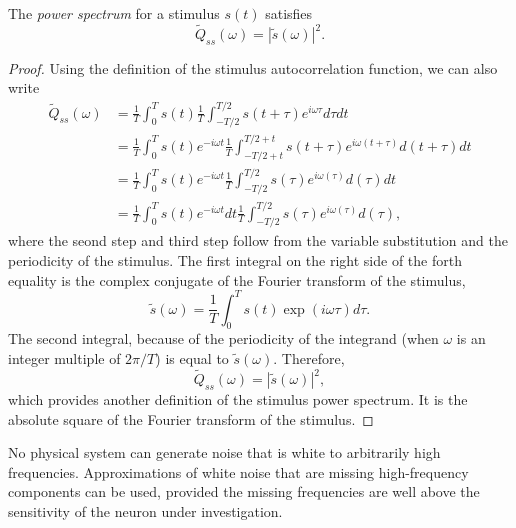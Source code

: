 \begin{prop}
  \label{prop:aliasForPowerSpectrum}
  The \emph{power spectrum} for a stimulus $s(t)$ satisfies
  \begin{equation}
    \label{equ:1.44}
    \widetilde{Q}_{ss}(\omega) = |\widetilde{s}(\omega)|^2.
  \end{equation}
\end{prop}
\begin{proof}
  Using the definition of the stimulus autocorrelation function, we can also write
  \begin{displaymath}        
    \begin{aligned}
      \label{equ:1.42}
      \widetilde{Q}_{ss}(\omega) &= \frac{1}{T} \int_0^T s(t) \frac{1}{T}\int_{-T/2}^{T/2} s(t+\tau)e^{i\omega\tau} d\tau dt \\
      &= \frac{1}{T} \int_0^T s(t)e^{-i\omega t} \frac{1}{T}\int_{-T/2+t}^{T/2+t}s(t+\tau)e^{i\omega(t+\tau)}d(t+\tau)dt\\
      &= \frac{1}{T} \int_0^T s(t)e^{-i\omega t} \frac{1}{T}\int_{-T/2}^{T/2}s(\tau)e^{i\omega(\tau)}d(\tau)dt\\
      &= \frac{1}{T} \int_0^T s(t)e^{-i\omega t}dt \frac{1}{T}\int_{-T/2}^{T/2}s(\tau)e^{i\omega(\tau)}d(\tau),
    \end{aligned}
  \end{displaymath}
  where the seond step and third step follow from the variable substitution and the periodicity of the stimulus.
  The first integral on the right side of the forth equality is the complex conjugate of the Fourier transform of the stimulus,
  \begin{equation}
    \label{equ:1.43}
    \widetilde{s}(\omega) = \frac{1}{T} \int_0^Ts(t)\exp(i\omega \tau)d\tau.
  \end{equation}
  The second integral, because of the periodicity of the integrand (when $\omega$ is an integer multiple of $2\pi / T$) is equal to $\widetilde{s}(\omega)$. Therefore,
  \begin{equation}
    \label{equ:1.44}
    \widetilde{Q}_{ss}(\omega) = |\widetilde{s}(\omega)|^2,
  \end{equation}
  which provides another definition of the stimulus power spectrum. It is the absolute square of the Fourier transform of the stimulus.
\end{proof}

\begin{rem}
  No physical system can generate noise that is white to arbitrarily high frequencies. Approximations of white noise that are missing high-frequency components can be used, provided the missing frequencies are well above the sensitivity of the neuron under investigation.
\end{rem}

